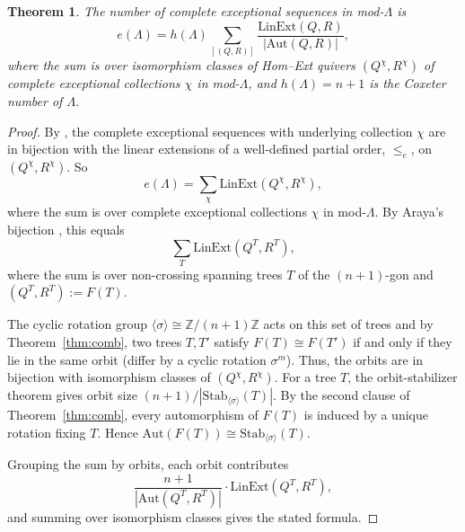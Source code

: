 \documentclass[12pt]{amsart}
\newtheorem{thm}{Theorem}[section]
\theoremstyle{definition}
\theoremstyle{remark}
\numberwithin{equation}{section}
\begin{document}
\begin{thm}\label{thm:expseq-count}
The number of complete exceptional sequences in mod-$\Lambda$ is
\[
e(\Lambda) = h(\Lambda) \sum_{[(Q,R)]} \frac{\mathrm{LinExt}(Q,R)}{|\mathrm{Aut}(Q,R)|},
\]
where the sum is over isomorphism classes of Hom--Ext quivers $(Q^\chi, R^\chi)$ of complete exceptional collections $\chi$ in mod-$\Lambda$, and $h(\Lambda) = n+1$ is the Coxeter number of $\Lambda$.
\end{thm}

\begin{proof}
By \cite[Theorem 3.4]{igusa2025hom}, the complete exceptional sequences with underlying collection \(\chi\) are in bijection with the linear extensions of a well-defined partial order, \(\leq_e\), on \((Q^\chi, R^\chi)\). So
\[
e(\Lambda) = \sum_{\chi} \mathrm{LinExt}(Q^\chi, R^\chi),
\]
where the sum is over complete exceptional collections \(\chi\) in mod-$\Lambda$. By Araya's bijection \cite{araya2013exceptional}, this equals
\[
\sum_{T} \mathrm{LinExt}(Q^T, R^T),
\]
where the sum is over non-crossing spanning trees \(T\) of the \((n+1)\)-gon and \((Q^T, R^T) := F(T)\).

The cyclic rotation group \(\langle \sigma \rangle \cong \mathbb{Z}/(n+1)\mathbb{Z}\) acts on this set of trees and by Theorem~\ref{thm:comb}, two trees \(T, T'\) satisfy \(F(T) \cong F(T')\) if and only if they lie in the same orbit (differ by a cyclic rotation \(\sigma^m\)). Thus, the orbits are in bijection with isomorphism classes of \((Q^\chi, R^\chi)\). For a tree \(T\), the orbit-stabilizer theorem gives orbit size \((n+1)/|\mathrm{Stab}_{\langle\sigma\rangle}(T)|\). By the second clause of Theorem~\ref{thm:comb}, every automorphism of \(F(T)\) is induced by a unique rotation fixing \(T\). Hence \(\mathrm{Aut}(F(T)) \cong \mathrm{Stab}_{\langle\sigma\rangle}(T)\).

Grouping the sum by orbits, each orbit contributes
\[
\frac{n+1}{|\mathrm{Aut}(Q^T, R^T)|} \cdot \mathrm{LinExt}(Q^T, R^T),
\]
and summing over isomorphism classes gives the stated formula.
\end{proof}



\end{document}
